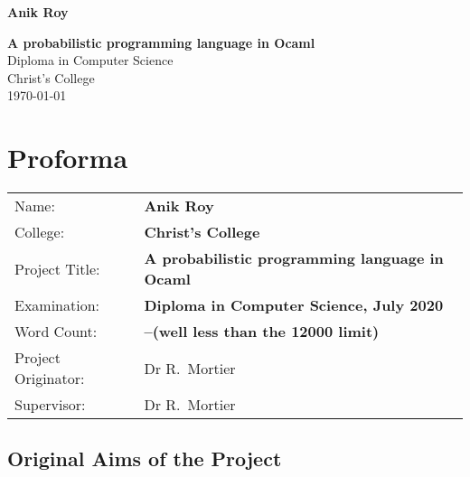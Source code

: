 \documentclass[12pt,twoside,notitlepage]{report}
\begin{document}





\pagestyle{empty}

\hfill{\LARGE \bf Anik Roy}

\vspace*{60mm}
\begin{center}
\Huge
{\bf A probabilistic programming language in Ocaml} \\
\vspace*{5mm}
Diploma in Computer Science \\
\vspace*{5mm}
Christ's College \\
\vspace*{5mm}
\today  %
\end{center}

\cleardoublepage


\setcounter{page}{1}
\pagestyle{plain}

\chapter*{Proforma}

{\large
\begin{tabular}{ll}
Name:               & \bf Anik Roy                       \\
College:            & \bf Christ's College                     \\
Project Title:      & \bf A probabilistic programming language in Ocaml \\
Examination:        & \bf Diploma in Computer Science, July 2020        \\
Word Count:         & \bf --\footnotemark[1]
(well less than the 12000 limit) \\
Project Originator: & Dr R.~Mortier                    \\
Supervisor:         & Dr R.~Mortier                    \\ 
\end{tabular}
}


\section*{Original Aims of the Project}
\end{document}
